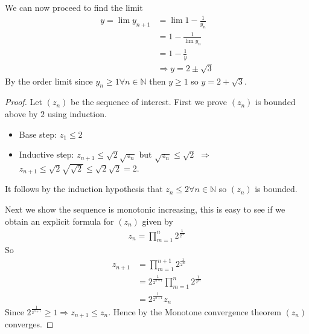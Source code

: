 We can now proceed to find the limit 
\begin{align*}
    y = \lim y_{n+1} &= \lim 1 - \frac{1}{y_n} \\ 
                &= 1 - \frac{1}{\lim y_n} \\
                &= 1 - \frac{1}{y} \\
                & \Rightarrow y = 2\pm \sqrt 3
\end{align*}
By the order limit \Thm since $y_n \geq 1 \forall n \in \mathbb{N}$ then $y \geq 1$ so $y = 2+\sqrt 3$.  

\begin{proof}
    Let $(z_n)$ be the sequence of interest. First we prove $(z_n)$ is bounded above by $2$ using
    induction.
    \begin{itemize}
        \item Base step: $z_1 \leq 2$
        \item Inductive step: $z_{n+1} \leq \sqrt 2 \sqrt{z_{n}}$ but $\sqrt{z_{n}} \leq \sqrt 2$ 
        $\Rightarrow$ $z_{n+1}\leq \sqrt 2 \sqrt{\sqrt 2} \leq \sqrt 2 \sqrt 2 = 2$.
    \end{itemize}
    It follows by the induction hypothesis that $z_n \leq 2 \forall n \in \mathbb{N}$ 
    so $(z_n)$ is bounded.

    Next we show the sequence is monotonic increasing, this is easy to see if we obtain an explicit formula
    for $(z_n)$ given by 
    \begin{align*}
        z_n = \prod_{m=1}^n 2^{\frac{1}{2^m}}
    \end{align*}
    So 
    \begin{align*}
        z_{n+1} &= \prod_{m=1}^{n+1} 2^{\frac{1}{2^m}} \\
                &= 2^{\frac{1}{2^{n+1}}}\prod_{m=1}^{n} 2^{\frac{1}{2^m}} \\
                &= 2^{\frac{1}{2^{n+1}}} z_n
    \end{align*}
    Since $2^{\frac{1}{2^{n+1}}} \geq 1 \Rightarrow z_{n+1} \leq z_n$. Hence by the Monotone convergence
    theorem $(z_n)$ converges.
\end{proof}

